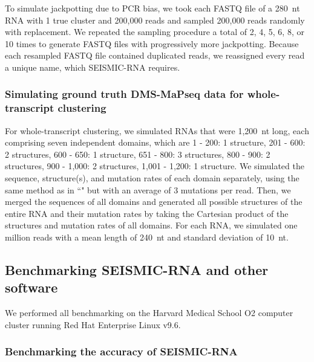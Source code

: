 \documentclass[11pt]{article}
\begin{document}
To simulate jackpotting due to PCR bias, we took each FASTQ file of a 280~nt RNA with 1 true cluster and 200,000 reads and sampled 200,000 reads randomly with replacement.
We repeated the sampling procedure a total of 2, 4, 5, 6, 8, or 10 times to generate FASTQ files with progressively more jackpotting.
Because each resampled FASTQ file contained duplicated reads, we reassigned every read a unique name, which SEISMIC-RNA requires.

\subsubsection{Simulating ground truth DMS-MaPseq data for whole-transcript clustering}
\label{sim-whole-transcript}

For whole-transcript clustering, we simulated RNAs that were 1,200~nt long, each comprising seven independent domains, which are 1 - 200: 1 structure, 201 - 600: 2 structures, 600 - 650: 1 structure, 651 - 800: 3 structures, 800 - 900: 2 structures, 900 - 1,000: 2 structures, 1,001 - 1,200: 1 structure.
We simulated the sequence, structure(s), and mutation rates of each domain separately, using the same method as in ``" but with an average of 3 mutations per read.
Then, we merged the sequences of all domains and generated all possible structures of the entire RNA and their mutation rates by taking the Cartesian product of the structures and mutation rates of all domains.
For each RNA, we simulated one million reads with a mean length of 240~nt and standard deviation of 10~nt.


\subsection{Benchmarking SEISMIC-RNA and other software}

We performed all benchmarking on the Harvard Medical School O2 computer cluster running Red Hat Enterprise Linux v9.6.

\subsubsection{Benchmarking the accuracy of SEISMIC-RNA}
\label{benchmark-accuracy-seismic-rna}
\end{document}
